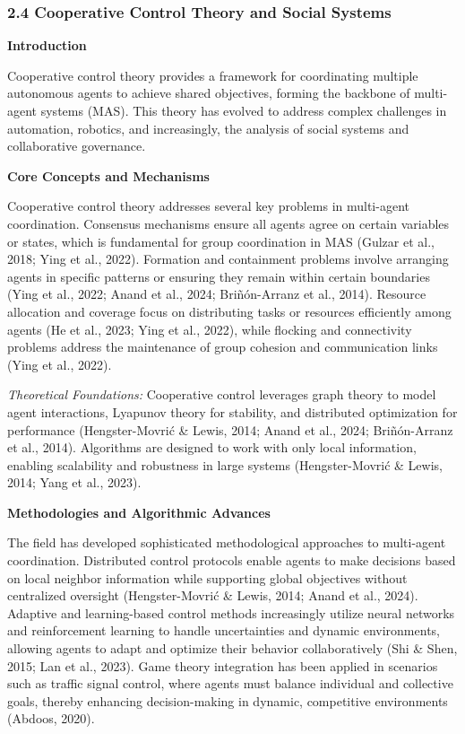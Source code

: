 \subsubsection{2.4 Cooperative Control Theory and Social
Systems}\label{cooperative-control-theory-and-social-systems}

\textbf{Introduction}

Cooperative control theory provides a framework for coordinating
multiple autonomous agents to achieve shared objectives, forming the
backbone of multi-agent systems (MAS). This theory has evolved to
address complex challenges in automation, robotics, and increasingly,
the analysis of social systems and collaborative governance.

\textbf{Core Concepts and Mechanisms}

Cooperative control theory addresses several key problems in multi-agent
coordination. Consensus mechanisms ensure all agents agree on certain
variables or states, which is fundamental for group coordination in MAS
(Gulzar et al., 2018; Ying et al., 2022). Formation and containment
problems involve arranging agents in specific patterns or ensuring they
remain within certain boundaries (Ying et al., 2022; Anand et al., 2024;
Briñón-Arranz et al., 2014). Resource allocation and coverage focus on
distributing tasks or resources efficiently among agents (He et al.,
2023; Ying et al., 2022), while flocking and connectivity problems
address the maintenance of group cohesion and communication links (Ying
et al., 2022).

\emph{Theoretical Foundations:} Cooperative control leverages graph
theory to model agent interactions, Lyapunov theory for stability, and
distributed optimization for performance (Hengster-Movrić \& Lewis,
2014; Anand et al., 2024; Briñón-Arranz et al., 2014). Algorithms are
designed to work with only local information, enabling scalability and
robustness in large systems (Hengster-Movrić \& Lewis, 2014; Yang et
al., 2023).

\textbf{Methodologies and Algorithmic Advances}

The field has developed sophisticated methodological approaches to
multi-agent coordination. Distributed control protocols enable agents to
make decisions based on local neighbor information while supporting
global objectives without centralized oversight (Hengster-Movrić \&
Lewis, 2014; Anand et al., 2024). Adaptive and learning-based control
methods increasingly utilize neural networks and reinforcement learning
to handle uncertainties and dynamic environments, allowing agents to
adapt and optimize their behavior collaboratively (Shi \& Shen, 2015;
Lan et al., 2023). Game theory integration has been applied in scenarios
such as traffic signal control, where agents must balance individual and
collective goals, thereby enhancing decision-making in dynamic,
competitive environments (Abdoos, 2020).

